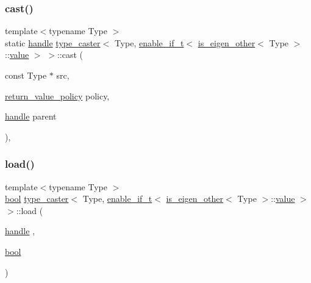 \subsubsection{\texorpdfstring{cast()}{cast()}\hspace{0.1cm}{\footnotesize\ttfamily [2/2]}}
{\footnotesize\ttfamily template$<$typename Type $>$ \\
static \mbox{\hyperlink{classhandle}{handle}} \mbox{\hyperlink{classtype__caster}{type\+\_\+caster}}$<$ Type, \mbox{\hyperlink{detail_2common_8h_a012819c9e8b5e04872a271f50f8b8196}{enable\+\_\+if\+\_\+t}}$<$ \mbox{\hyperlink{eigen_8h_a7be1c6745b73821227ddafd46d41c583}{is\+\_\+eigen\+\_\+other}}$<$ Type $>$\+::\mbox{\hyperlink{_s_d_l__opengl__glext_8h_a8ad81492d410ff2ac11f754f4042150f}{value}} $>$ $>$\+::cast (\begin{DoxyParamCaption}\item[{const Type $\ast$}]{src,  }\item[{\mbox{\hyperlink{detail_2common_8h_adde72ab1fb0dd4b48a5232c349a53841}{return\+\_\+value\+\_\+policy}}}]{policy,  }\item[{\mbox{\hyperlink{classhandle}{handle}}}]{parent }\end{DoxyParamCaption})\hspace{0.3cm}{\ttfamily [inline]}, {\ttfamily [static]}}

\mbox{\label{structtype__caster_3_01_type_00_01enable__if__t_3_01is__eigen__other_3_01_type_01_4_1_1value_01_4_01_4_a4fc54d74dd4bd4748303a182b02258d1}} 
\subsubsection{\texorpdfstring{load()}{load()}}
{\footnotesize\ttfamily template$<$typename Type $>$ \\
\mbox{\hyperlink{asdl_8h_af6a258d8f3ee5206d682d799316314b1}{bool}} \mbox{\hyperlink{classtype__caster}{type\+\_\+caster}}$<$ Type, \mbox{\hyperlink{detail_2common_8h_a012819c9e8b5e04872a271f50f8b8196}{enable\+\_\+if\+\_\+t}}$<$ \mbox{\hyperlink{eigen_8h_a7be1c6745b73821227ddafd46d41c583}{is\+\_\+eigen\+\_\+other}}$<$ Type $>$\+::\mbox{\hyperlink{_s_d_l__opengl__glext_8h_a8ad81492d410ff2ac11f754f4042150f}{value}} $>$ $>$\+::load (\begin{DoxyParamCaption}\item[{\mbox{\hyperlink{classhandle}{handle}}}]{,  }\item[{\mbox{\hyperlink{asdl_8h_af6a258d8f3ee5206d682d799316314b1}{bool}}}]{ }\end{DoxyParamCaption})\hspace{0.3cm}{\ttfamily [delete]}}

